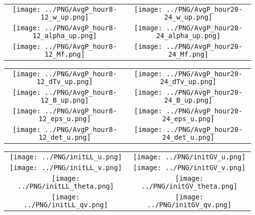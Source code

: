 \documentclass{article}
\begin{document}

\begin{table}
  \begin{tabular}{cc}
     \texttt{[image: ../PNG/AvgP\_hour8-12\_w\_up.png]}     & \texttt{[image: ../PNG/AvgP\_hour20-24\_w\_up.png]}     \\
     \texttt{[image: ../PNG/AvgP\_hour8-12\_alpha\_up.png]} & \texttt{[image: ../PNG/AvgP\_hour20-24\_alpha\_up.png]} \\
     \texttt{[image: ../PNG/AvgP\_hour8-12\_Mf.png]}       & \texttt{[image: ../PNG/AvgP\_hour20-24\_Mf.png]}
  \end{tabular}
\end{table}

\newpage

\begin{table}
  \begin{tabular}{cc}
     \texttt{[image: ../PNG/AvgP\_hour8-12\_dTv\_up.png]} & \texttt{[image: ../PNG/AvgP\_hour20-24\_dTv\_up.png]} \\
     \texttt{[image: ../PNG/AvgP\_hour8-12\_B\_up.png]}   & \texttt{[image: ../PNG/AvgP\_hour20-24\_B\_up.png]}   \\
     \texttt{[image: ../PNG/AvgP\_hour8-12\_eps\_u.png]}  & \texttt{[image: ../PNG/AvgP\_hour20-24\_eps\_u.png]}  \\
     \texttt{[image: ../PNG/AvgP\_hour8-12\_det\_u.png]}  & \texttt{[image: ../PNG/AvgP\_hour20-24\_det\_u.png]}
  \end{tabular}
\end{table}

\newpage

\begin{table}
  \begin{tabular}{cc}
     \texttt{[image: ../PNG/initLL\_u.png]}     & \texttt{[image: ../PNG/initGV\_u.png]}     \\
     \texttt{[image: ../PNG/initLL\_v.png]}     & \texttt{[image: ../PNG/initGV\_v.png]}     \\
     \texttt{[image: ../PNG/initLL\_theta.png]} & \texttt{[image: ../PNG/initGV\_theta.png]} \\
     \texttt{[image: ../PNG/initLL\_qv.png]}    & \texttt{[image: ../PNG/initGV\_qv.png]}
  \end{tabular}
\end{table}
\end{document}

